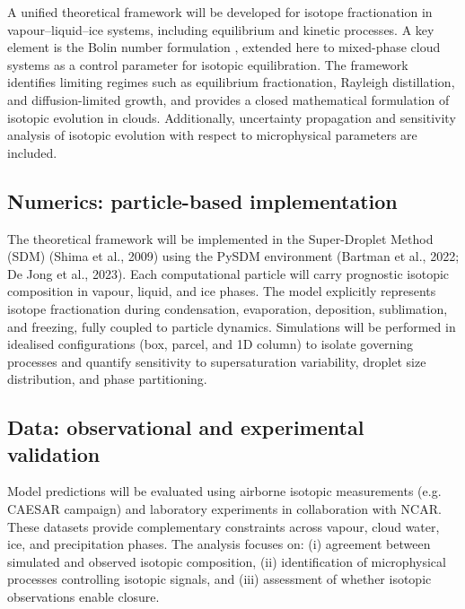 \documentclass[12pt]{article}
\begin{document}
A unified theoretical framework will be developed for isotope fractionation in
vapour--liquid--ice systems, including equilibrium and kinetic processes.
A key element is the Bolin number formulation
\parencite{1958_Bolin}, extended here to mixed-phase cloud systems as a control parameter
for isotopic equilibration.
The framework identifies limiting regimes such as equilibrium fractionation,
Rayleigh distillation, and diffusion-limited growth, and provides a closed
mathematical formulation of isotopic evolution in clouds.
Additionally, uncertainty propagation and sensitivity analysis of isotopic evolution
with respect to microphysical parameters are included.

\subsection{Numerics: particle-based implementation}

The theoretical framework will be implemented in the Super-Droplet Method (SDM)
(Shima et al., 2009) using the PySDM environment (Bartman et al., 2022; De Jong et al., 2023).
Each computational particle will carry prognostic isotopic composition in vapour,
liquid, and ice phases.
The model explicitly represents isotope fractionation during condensation,
evaporation, deposition, sublimation, and freezing, fully coupled to particle
dynamics.
Simulations will be performed in idealised configurations (box, parcel, and 1D column)
to isolate governing processes and quantify sensitivity to supersaturation variability,
droplet size distribution, and phase partitioning.

\subsection{Data: observational and experimental validation}

Model predictions will be evaluated using airborne isotopic measurements
(e.g. CAESAR campaign) and laboratory experiments in collaboration with NCAR.
These datasets provide complementary constraints across vapour, cloud water,
ice, and precipitation phases.
The analysis focuses on:
(i) agreement between simulated and observed isotopic composition,
(ii) identification of microphysical processes controlling isotopic signals,
and (iii) assessment of whether isotopic observations enable closure.

\end{document}
